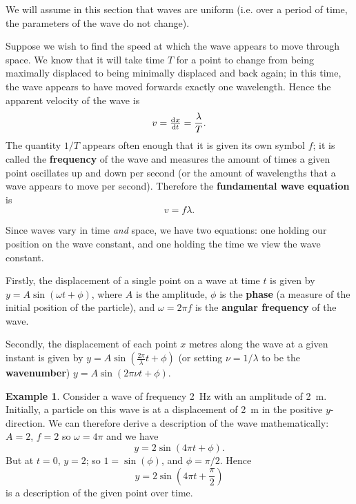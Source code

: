 \documentclass[a4paper]{amsbook}
\theoremstyle{definition}
\newtheorem*{example}{Example}
\numberwithin{exercise}{chapter}
\numberwithin{exercise}{chapter}
\begin{document}
We will assume in this section that waves are uniform (i.e. over a period of time, the parameters
of the wave do not change).

Suppose we wish to find the speed at which the wave appears to move through space.
We know that it will take time $ T $ for a point to change from being maximally displaced
to being minimally displaced and back again; in this time, the wave appears to have moved
forwards exactly one wavelength. Hence the apparent velocity of the wave is
\begin{displaymath}
  v = \od{x}{t} = \frac{\lambda}{T}.
\end{displaymath}
The quantity $ 1/T $ appears often enough that it is given its own symbol $ f $; it is
called the \textbf{frequency} of the wave and measures the amount of times a given point
oscillates up and down per second (or the amount of wavelengths that a wave appears
to move per second). Therefore the \textbf{fundamental wave equation} is
\begin{equation}
  v = f\lambda.
\end{equation}

Since waves vary in time \textit{and} space, we have two equations: one holding our position on
the wave constant, and one holding the time we view the wave constant.

Firstly, the displacement of a single point on a wave at time $ t $ is given by $ y = A\sin(\omega t + \phi) $,
where $ A $ is the amplitude, $ \phi $ is the \textbf{phase} (a measure of the initial position of the particle),
and $ \omega = 2\pi f $ is the \textbf{angular frequency} of the wave.

Secondly, the displacement of each point $ x $ metres along the wave at a given instant is given by $ y = A\sin(\frac{2\pi}{\lambda} t + \phi) $
(or setting $ \nu = 1/\lambda $ to be the \textbf{wavenumber}) $ y = A\sin(2\pi\nu t + \phi) $.

\begin{example}
  Consider a wave of frequency \SI{2}{\hertz} with an amplitude of \SI{2}{\metre}. Initially, a particle on
  this wave  is at a displacement of \SI{2}{\metre} in the positive $ y$-direction. We can therefore derive a description of the
  wave mathematically: $ A = 2 $, $ f = 2 $ so $ \omega = 4\pi $ and we have
  \begin{displaymath}
    y = 2 \sin(4\pi t + \phi).
  \end{displaymath}
  But at $ t = 0 $, $ y = 2 $; so $ 1 = \sin(\phi) $, and $ \phi = \pi/2 $. Hence
  \begin{displaymath}
    y = 2\sin\left(4\pi t + \frac{\pi}{2}\right)
  \end{displaymath}
  is a description of the given point over time.
\end{example}
\end{document}
